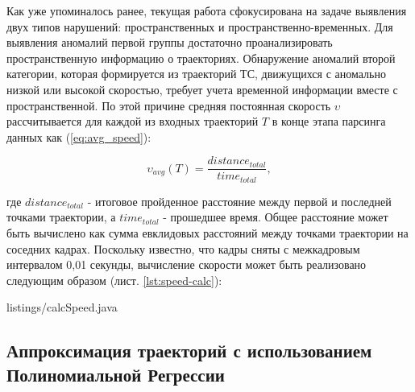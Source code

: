 
Как уже упоминалось ранее, текущая работа сфокусирована на задаче выявления двух типов нарушений: пространственных и пространственно-временных. Для выявления аномалий первой группы достаточно проанализировать пространственную информацию о траекториях. Обнаружение аномалий второй категории, которая формируется из траекторий ТС, движущихся с аномально низкой или высокой скоростью, требует учета временной информации вместе с пространственной. По этой причине средняя постоянная скорость $\upsilon$ рассчитывается для каждой из входных траекторий $T$ в конце этапа парсинга данных как (\ref{eq:avg_speed}):

\begin{equation} \label{eq:avg_speed}
\upsilon_{avg}(T) = \frac{distance_{total}} {time_{total}},
\end{equation}

где $distance_{total}$ - итоговое пройденное расстояние между первой и последней точками траектории, а $time_{total}$ - прошедшее время. Общее расстояние может быть вычислено как сумма евклидовых расстояний между точками траектории на соседних кадрах. Поскольку известно, что кадры сняты с межкадровым интервалом 0,01 секунды, вычисление скорости может быть реализовано следующим образом (лист. \ref{lst:speed-calc}):

\lstset{style=code-style-java}
 {listings/calcSpeed.java}

\subsection{Аппроксимация траекторий с использованием Полиномиальной Регрессии}

